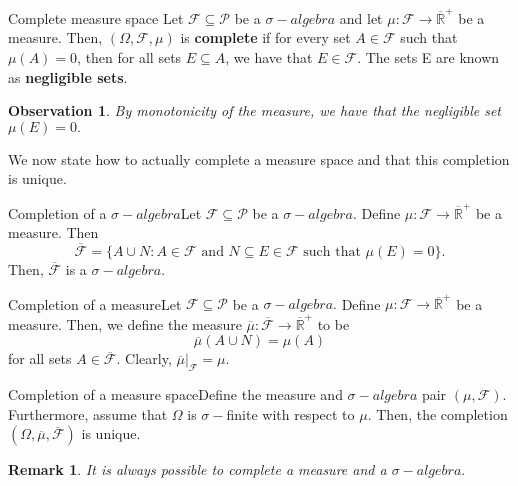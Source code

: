 \documentclass[twoside]{article}
\newtheorem{remark}[theorem]{Remark}
\newtheorem{observation}[theorem]{Observation}
\newcommand{\sigmalgebra}{\mathcal{F}}
\newcommand{\sa}{\sigma-algebra}
\newcommand{\powerset}{\mathcal{P}}
\newcommand{\positiveextendedreal}{\overline{\mathbb{R}}^+}
\begin{document}
\begin{definition_exam}{Complete measure space}{} Let $\sigmalgebra \subseteq \powerset$ be a $\sa$ and let $\mu: \sigmalgebra \rightarrow \positiveextendedreal$ be a measure. Then, $(\Omega, \sigmalgebra, \mu)$ is \textbf{complete} if for every set $A \in \sigmalgebra$ such that $\mu(A) = 0$, then for all sets $E \subseteq A$, we have that $E \in \sigmalgebra.$ The sets E are known as \textbf{negligible sets}.
\end{definition_exam}


\begin{observation}By monotonicity of the measure, we have that the negligible set $\mu(E) = 0.$
\end{observation}

We now state how to actually complete a measure space and that this completion is unique.

\begin{proposition_exam}{Completion of a $\sa$}{}Let $\sigmalgebra \subseteq \powerset$ be a $\sa.$ Define $\mu: \sigmalgebra \rightarrow \positiveextendedreal$ be a measure. Then 
$$
\overline{\sigmalgebra} = \{A \cup N: A \in \sigmalgebra \text{ and } N \subseteq E \in \sigmalgebra \text{ such that } \mu(E) = 0\}.
$$
Then, $\overline{\sigmalgebra}$ is a $\sa.$
\end{proposition_exam}


\begin{proposition_exam}{Completion of a measure}{}Let $\sigmalgebra \subseteq \powerset$ be a $\sa.$ Define $\mu: \sigmalgebra \rightarrow \positiveextendedreal$ be a measure. Then, we define the measure $\overline{\mu}: \overline{\sigmalgebra} \rightarrow \positiveextendedreal$ to be 
$$
\overline{\mu}(A \cup N) = \mu(A)
$$
for all sets $A \in \overline{\sigmalgebra}.$ Clearly, $\overline{\mu}|_{\sigmalgebra} = \mu.$
\end{proposition_exam}


\begin{theorem_exam}{Completion of a measure space}{}Define the measure and $\sa$ pair $(\mu, \sigmalgebra)$. Furthermore, assume that $\Omega$ is $\sigma-$finite with respect to $\mu.$ Then, the completion $(\Omega, \overline{\mu}, \overline{\sigmalgebra})$ is unique.
\end{theorem_exam}

\begin{remark}It is always possible to complete a measure and a $\sa.$
\end{remark}
\end{document}

